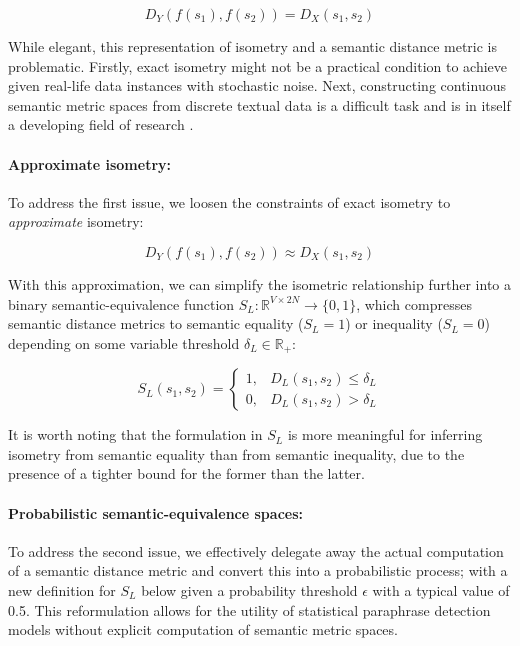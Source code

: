 \documentclass[11pt,a4paper]{article}
\begin{document}
\begin{equation}  
  \label{exact_isometry_eqn}
  D_Y(f(s_1),f(s_2)) = D_X(s_1,s_2)
\end{equation}

While elegant, this representation of isometry and a semantic distance metric is problematic. Firstly, exact isometry might not be a practical condition to achieve given real-life data instances with stochastic noise. Next, constructing continuous semantic metric spaces from discrete textual data is a difficult task and is in itself a developing field of research \cite{cer2017semeval}.

\paragraph{Approximate isometry:} To address the first issue, we loosen the constraints of exact isometry to \textit{approximate} isometry:

\begin{equation} 
  \label{approx_isometry_eqn}
  D_Y(f(s_1),f(s_2)) \approx D_X(s_1,s_2) 
\end{equation}

With this approximation, we can simplify the isometric relationship further into a binary semantic-equivalence function $S_L: \mathbb{R}^{V \times 2N} \to \{0,1\}$, which compresses semantic distance metrics to semantic equality ($S_L=1$) or inequality ($S_L=0$) depending on some variable threshold $\delta_L \in \mathbb{R}_+$:

\begin{equation}
  \label{bounded_isometry_eqn}
  S_L(s_1,s_2) =
  \begin{cases}
    1, &D_L(s_1,s_2) \leq \delta_L \\
    0, &D_L(s_1,s_2) > \delta_L
  \end{cases}
\end{equation}

It is worth noting that the formulation in $S_L$ is more meaningful for inferring isometry from semantic equality than from semantic inequality, due to the presence of a tighter bound for the former than the latter.

\paragraph{Probabilistic semantic-equivalence spaces:} To address the second issue, we effectively delegate away the actual computation of a semantic distance metric and convert this into a probabilistic process; with a new definition for $S_L$ below given a probability threshold $\epsilon$ with a typical value of 0.5. This reformulation allows for the utility of statistical paraphrase detection models without explicit computation of semantic metric spaces. 
\end{document}
